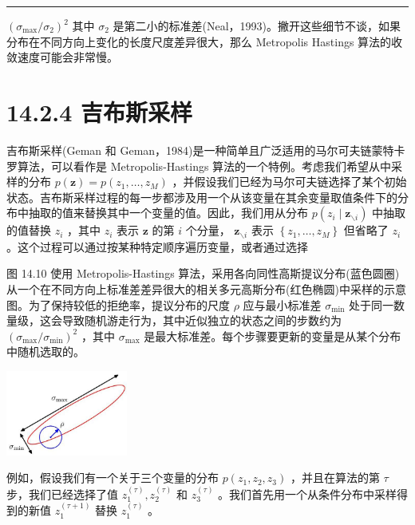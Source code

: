 \documentclass[10pt]{report}
\newcommand{\HRule}{\begin{center}\rule{0.9\linewidth}{0.2mm}\end{center}}
\begin{document}
\HRule

\({\left( {\sigma }_{\max }/{\sigma }_{2}\right) }^{2}\) 其中 \({\sigma }_{2}\) 是第二小的标准差(Neal，1993)。撇开这些细节不谈，如果分布在不同方向上变化的长度尺度差异很大，那么 Metropolis Hastings 算法的收敛速度可能会非常慢。

\section*{14.2.4 吉布斯采样}

吉布斯采样(Geman 和 Geman，1984)是一种简单且广泛适用的马尔可夫链蒙特卡罗算法，可以看作是 Metropolis-Hastings 算法的一个特例。考虑我们希望从中采样的分布 \(p\left( \mathbf{z}\right)  = p\left( {{z}_{1},\ldots ,{z}_{M}}\right)\) ，并假设我们已经为马尔可夫链选择了某个初始状态。吉布斯采样过程的每一步都涉及用一个从该变量在其余变量取值条件下的分布中抽取的值来替换其中一个变量的值。因此，我们用从分布 \(p\left( {{z}_{i} \mid  {\mathbf{z}}_{\smallsetminus i}}\right)\) 中抽取的值替换 \({z}_{i}\) ，其中 \({z}_{i}\) 表示 \(\mathbf{z}\) 的第 \(i\) 个分量， \({\mathbf{z}}_{\smallsetminus i}\) 表示 \(\left\{  {{z}_{1},\ldots ,{z}_{M}}\right\}\) 但省略了 \({z}_{i}\) 。这个过程可以通过按某种特定顺序遍历变量，或者通过选择

图 14.10 使用 Metropolis-Hastings 算法，采用各向同性高斯提议分布(蓝色圆圈)从一个在不同方向上标准差差异很大的相关多元高斯分布(红色椭圆)中采样的示意图。为了保持较低的拒绝率，提议分布的尺度 \(\rho\) 应与最小标准差 \({\sigma }_{\min }\) 处于同一数量级，这会导致随机游走行为，其中近似独立的状态之间的步数约为 \({\left( {\sigma }_{\max }/{\sigma }_{\min }\right) }^{2}\) ，其中 \({\sigma }_{\max }\) 是最大标准差。每个步骤要更新的变量是从某个分布中随机选取的。

\begin{center}
\includegraphics[max width=0.3\textwidth]{images/0194e279-9b28-703a-88f4-c3ac21e2010d_466_1088_343_464_325_0.jpg}
\end{center}
\hspace*{3em} 

例如，假设我们有一个关于三个变量的分布 \(p\left( {{z}_{1},{z}_{2},{z}_{3}}\right)\) ，并且在算法的第 \(\tau\) 步，我们已经选择了值 \({z}_{1}^{\left( \tau \right) },{z}_{2}^{\left( \tau \right) }\) 和 \({z}_{3}^{\left( \tau \right) }\) 。我们首先用一个从条件分布中采样得到的新值 \({z}_{1}^{\left( \tau  + 1\right) }\) 替换 \({z}_{1}^{\left( \tau \right) }\) 。
\end{document}
